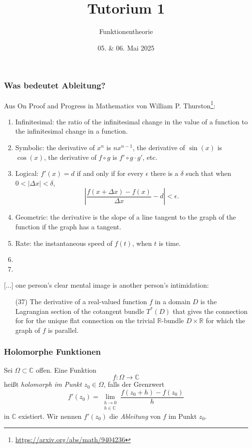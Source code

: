 \documentclass[10pt]{beamer}
\author[\url{https://fdf-uni.github.io/ft}]{}
\title{Tutorium 1}
\subtitle{\texorpdfstring{Funktionentheorie\vspace*{-1.5cm}}{Funktionentheorie}}
\date{05. \& 06. Mai 2025}
\begin{document}
\begin{frame}
	\titlepage
\end{frame}
\begin{frame}
	\frametitle{Was bedeutet \glqq Ableitung\grqq{}?}
	\pause
	Aus \glqq{}On Proof and Progress in Mathematics\grqq{} von William P. Thurston\footnote{\url{https://arxiv.org/abs/math/9404236}}:
	\pause
	\begin{enumerate}[label=(\arabic*)]
		\item Infinitesimal: the ratio of the infinitesimal change in the value of a function to the infinitesimal change in a function.
		      \pause
		\item Symbolic: the derivative of $x^n$ is $n x^{n - 1}$, the derivative of $\sin(x)$ is $\cos(x)$, the derivative of $f \circ g$ is $f' \circ g \cdot g'$, etc.
		      \pause
		\item Logical: $f'(x) = d$ if and only if for every $\epsilon$ there is a $\delta$ such that when $0 < \lvert \Delta x \rvert < \delta$,
		      \[ \left\lvert \frac{f(x + \Delta x) - f(x)}{\Delta x} - d \right\rvert < \epsilon. \]
		      \pause
		\item Geometric: the derivative is the slope of a line tangent to the graph of the function if the graph has a tangent.
		      \pause
		\item Rate: the instantaneous speed of $f(t)$, when $t$ is time.
		      \pause
		\item {\color<10->{blue}{Approximation: The derivative of a function is the best linear approximation to the function near a point.}}
		      \pause
		\item {\color<11->{blue}{Microscopic: The derivative of a function is the limit of what you get by looking at it under a microscope of higher and higher power.}}
	\end{enumerate}
\end{frame}
\begin{frame}
	\glqq{}[...] one person's clear mental image is another person's intimidation:
	\begin{enumerate}
		\item[(37)] The derivative of a real-valued function $f$ in a domain $D$ is the Lagrangian section of the cotangent bundle $T^{\ast}(D)$ that gives the connection for for the unique flat connection on the trivial $\mathbb{R}$-bundle $D \times \mathbb{R}$ for which the graph of $f$ is parallel.\grqq{}
	\end{enumerate}
\end{frame}
\begin{frame}
	\frametitle{Holomorphe Funktionen}
	\begin{definition}
		Sei $\Omega \subset \mathbb{C}$ offen.
		Eine Funktion
		$$
			f \colon \Omega \to \mathbb{C}
		$$
		heißt \emph{holomorph im Punkt $z_0 \in \Omega$}, falls der Grenzwert
		$$
			f'(z_0) = \lim_{\substack{h \to 0 \\ h \in \mathbb{C}}} \frac{f(z_0 + h) - f(z_0)}{h}
		$$
		in $\mathbb{C}$ existiert.
		Wir nennen $f'(z_0)$ die \emph{Ableitung} von $f$ im Punkt $z_0$.
	\end{definition}
\end{frame}
\end{document}
